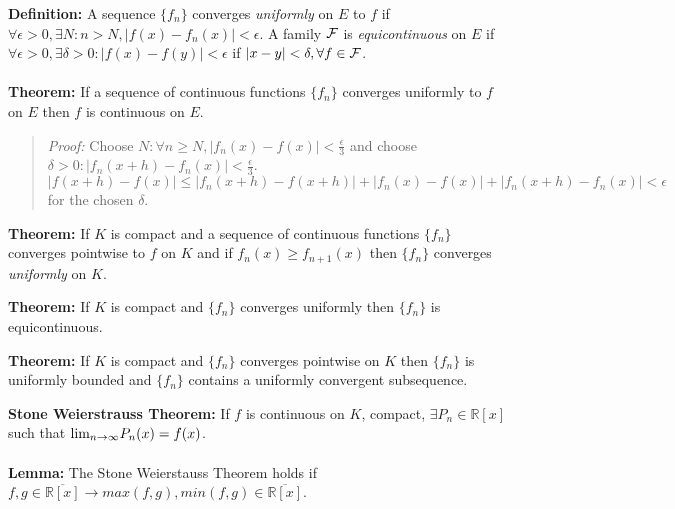 {\bf Definition:} 
A sequence $\{ f_n \}$ converges \emph{uniformly} on $E$ to $f$ if $\forall \epsilon >0, \exists N: n>N,
|f(x) - f_n(x)| < \epsilon$.
A family ${\cal F}$ is \emph{equicontinuous} on $E$ if $\forall \epsilon > 0, \exists \delta >0:
|f(x)-f(y)| < \epsilon$ if $|x-y| < \delta, \forall f \in {\cal F}$.
\\
\\
{\bf Theorem:} If a sequence of continuous functions $\{ f_n \}$ converges uniformly to $f$ on $E$ then
$f$ is continuous on $E$.
\begin{quote}
\emph{Proof:} Choose $N: \forall n \geq N, |f_n(x) - f(x)| < {\frac {\epsilon} {3}}$ and choose 
$\delta > 0: |f_n(x+h) - f_n(x)| < {\frac {\epsilon} {3}}$.
$|f(x+h) - f(x)| \leq |f_n(x + h) - f(x + h)| + |f_n(x) - f(x)| + |f_n(x+h) - f_n(x)| < \epsilon$ for
the chosen $\delta$.
\end{quote}
{\bf Theorem:} If $K$ is compact and a sequence of continuous functions $\{ f_n \}$
converges pointwise to $f$ on $K$
and if $f_n(x) \geq f_{n+1}(x)$ then $\{ f_n \}$ converges \emph{uniformly} on $K$.
\begin{quote}
\end{quote}
{\bf Theorem:} If $K$ is compact and $\{ f_n \}$ converges uniformly then $\{ f_n \}$ is equicontinuous.
\begin{quote}
\end{quote}
{\bf Theorem:} If $K$ is compact and $\{ f_n \}$ converges pointwise on $K$ then $\{ f_n \}$ is uniformly
bounded and $\{ f_n \}$ contains a uniformly convergent subsequence.
\begin{quote}
\end{quote}
{\bf Stone Weierstrauss Theorem:} If $f$ is continuous on $K$, compact, $\exists P_n \in {\mathbb R}[x]$ such that
$\textnormal{lim}_{n \rightarrow \infty} P_n(x)= f(x)$.
\\
\\
{\bf Lemma:} The Stone Weierstauss Theorem holds if 
$f, g \in {\overline {{\mathbb R}[x]}} \rightarrow max(f,g), min(f,g) \in {\overline {{\mathbb R}[x]}}$.
